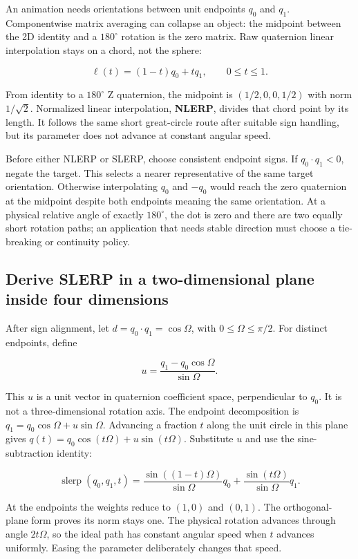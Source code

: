 An animation needs orientations between unit endpoints \(q_0\) and \(q_1\). Componentwise matrix averaging can collapse an object: the midpoint between the 2D identity and a \(180^\circ\) rotation is the zero matrix. Raw quaternion linear interpolation stays on a chord, not the sphere:

\[
\ell(t)=(1-t)q_0+tq_1,\qquad 0\le t\le1.
\]

From identity to a \(180^\circ\) Z quaternion, the midpoint is \((1/2,0,0,1/2)\) with norm \(1/\sqrt2\). Normalized linear interpolation, \textbf{NLERP}, divides that chord point by its length. It follows the same short great-circle route after suitable sign handling, but its parameter does not advance at constant angular speed.

Before either NLERP or SLERP, choose consistent endpoint signs. If \(q_0\cdot q_1<0\), negate the target. This selects a nearer representative of the same target orientation. Otherwise interpolating \(q_0\) and \(-q_0\) would reach the zero quaternion at the midpoint despite both endpoints meaning the same orientation. At a physical relative angle of exactly \(180^\circ\), the dot is zero and there are two equally short rotation paths; an application that needs stable direction must choose a tie-breaking or continuity policy.

\subsection{Derive SLERP in a two-dimensional plane inside four dimensions}\label{01-foundations-i-ch019-derive-slerp-in-a-two-dimensional-plane-inside-four-dimensions}

After sign alignment, let \(d=q_0\cdot q_1=\cos\Omega\), with \(0\le\Omega\le\pi/2\). For distinct endpoints, define

\[
u=\frac{q_1-q_0\cos\Omega}{\sin\Omega}.
\]

This \(u\) is a unit vector in quaternion coefficient space, perpendicular to \(q_0\). It is not a three-dimensional rotation axis. The endpoint decomposition is \(q_1=q_0\cos\Omega+u\sin\Omega\). Advancing a fraction \(t\) along the unit circle in this plane gives \(q(t)=q_0\cos(t\Omega)+u\sin(t\Omega)\). Substitute \(u\) and use the sine-subtraction identity:

\[
\operatorname{slerp}(q_0,q_1,t)=
\frac{\sin((1-t)\Omega)}{\sin\Omega}q_0
+\frac{\sin(t\Omega)}{\sin\Omega}q_1.
\]

At the endpoints the weights reduce to \((1,0)\) and \((0,1)\). The orthogonal-plane form proves its norm stays one. The physical rotation advances through angle \(2t\Omega\), so the ideal path has constant angular speed when \(t\) advances uniformly. Easing the parameter deliberately changes that speed.


